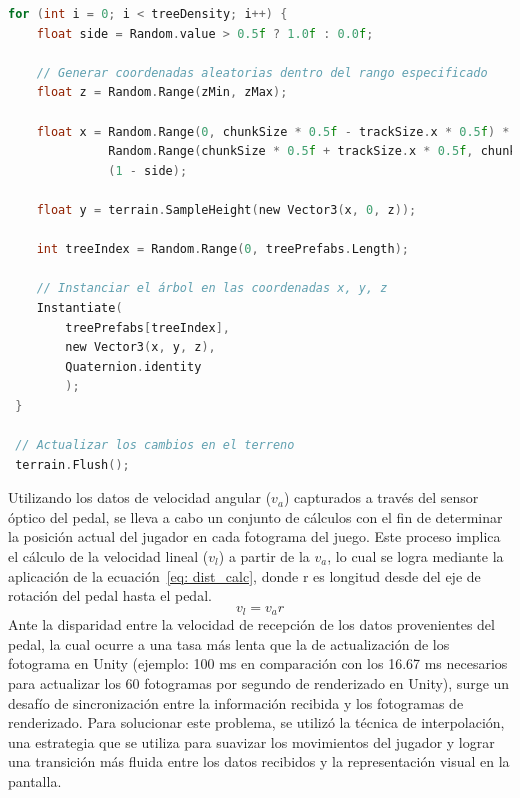 \begin{center}
\begin{minipage}{0.8\textwidth}
\begin{lstlisting}[language=c, caption={Posicionar árboles}]    
 for (int i = 0; i < treeDensity; i++) {
    float side = Random.value > 0.5f ? 1.0f : 0.0f;

    // Generar coordenadas aleatorias dentro del rango especificado
    float z = Random.Range(zMin, zMax);  

    float x = Random.Range(0, chunkSize * 0.5f - trackSize.x * 0.5f) * side  +
              Random.Range(chunkSize * 0.5f + trackSize.x * 0.5f, chunkSize) * 
              (1 - side);

    float y = terrain.SampleHeight(new Vector3(x, 0, z)); 

    int treeIndex = Random.Range(0, treePrefabs.Length);
    
    // Instanciar el árbol en las coordenadas x, y, z 
    Instantiate(
        treePrefabs[treeIndex], 
        new Vector3(x, y, z), 
        Quaternion.identity
        );
 }

 // Actualizar los cambios en el terreno
 terrain.Flush();
\end{lstlisting}
\end{minipage}  
\end{center}


\vspace{5pt}
Utilizando los datos de velocidad angular ($v_{a}$) capturados a través del sensor óptico del pedal, se lleva a 
cabo un conjunto de cálculos con el fin de determinar la posición actual del jugador en cada fotograma 
del juego. Este proceso implica el cálculo de la velocidad lineal ($v_{l}$) a partir de la $v_{a}$, lo 
cual se logra mediante la aplicación de la ecuación~\ref{eq: dist_calc}, donde r es longitud desde del eje de rotación del pedal hasta el pedal.
\begin{equation}
    v_{l} = v_{a}r
    \label{eq: dist_calc}        
\end{equation}
Ante la disparidad entre la velocidad de recepción de los datos provenientes del pedal, la cual ocurre a una tasa más lenta que la de actualización de los fotograma en Unity
(ejemplo: 100 ms en comparación con los 16.67 ms necesarios para actualizar los 60 fotogramas por segundo de renderizado en Unity), surge un desafío de sincronización entre la información 
recibida y los fotogramas de renderizado. Para solucionar este problema, se utilizó la técnica de interpolación, una estrategia que se utiliza para suavizar los movimientos 
del jugador y lograr una transición más fluida entre los datos recibidos y la representación visual en la pantalla.

